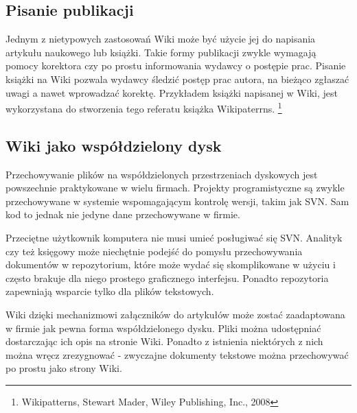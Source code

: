 \documentclass{article}
\begin{document}

	\subsection{Pisanie publikacji}

	Jednym z nietypowych zastosowań Wiki może być użycie jej do napisania artykułu naukowego lub książki. Takie formy publikacji zwykle wymagają pomocy korektora czy po prostu informowania wydawcy o postępie prac. Pisanie książki na Wiki pozwala wydawcy śledzić postęp prac autora, na bieżąco zgłaszać uwagi a nawet wprowadzać korektę. Przykładem książki napisanej w Wiki, jest wykorzystana  do stworzenia tego referatu książka Wikipaterrns. \footnote{Wikipatterns, Stewart Mader, Wiley Publishing, Inc., 2008}


	\subsection{Wiki jako współdzielony dysk}
		Przechowywanie plików na współdzielonych przestrzeniach dyskowych jest powszechnie praktykowane w wielu firmach. Projekty programistyczne są zwykle przechowywane w systemie wspomagającym kontrolę wersji, takim jak SVN. Sam kod to jednak nie jedyne dane przechowywane w firmie. 

Przeciętne użytkownik komputera nie musi umieć posługiwać się SVN. Analityk czy też księgowy może niechętnie podejść do pomysłu przechowywania dokumentów w repozytorium, które może wydać się skomplikowane w użyciu i często brakuje dla niego prostego graficznego interfejsu. Ponadto repozytoria zapewniają wsparcie tylko dla plików tekstowych. 

Wiki dzięki mechanizmowi załączników do artykułów może zostać zaadaptowana w firmie jak pewna forma współdzielonego dysku. Pliki można udostępniać dostarczając ich opis na stronie Wiki. Ponadto z istnienia niektórych z nich można wręcz zrezygnować - zwyczajne dokumenty tekstowe można przechowywać po prostu jako strony Wiki.
\end{document}
